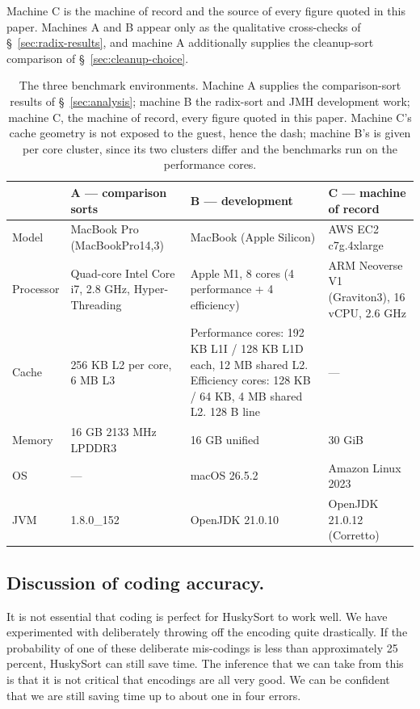 \documentclass[twoside,leqno,twocolumn]{article}
\begin{document}
Machine C is the machine of record and the source of every figure quoted in this paper.
Machines A and B appear only as the qualitative cross-checks of \S~\ref{sec:radix-results}, and
machine A additionally supplies the cleanup-sort comparison of \S~\ref{sec:cleanup-choice}.

\begin{table}
  \caption{The three benchmark environments. Machine A supplies the comparison-sort results of
    \S~\ref{sec:analysis}; machine B the radix-sort and JMH development work; machine C, the machine
    of record, every figure quoted in this paper. Machine C's cache geometry is not exposed to the
    guest, hence the dash; machine B's is given per core cluster, since its two clusters differ and
    the benchmarks run on the performance cores.}
  \label{tab:SysEnv}
  \centering
  \begin{tabularx}{\linewidth}{lXXX}
    \toprule
    & \textbf{A} --- comparison sorts & \textbf{B} --- development & \textbf{C} --- machine of record \\
    \midrule
    Model & MacBook Pro (MacBookPro14,3) & MacBook (Apple Silicon) & AWS EC2 c7g.4xlarge \\
    Processor & Quad-core Intel Core i7, 2.8 GHz, Hyper-Threading & Apple M1, 8 cores (4 performance + 4 efficiency) & ARM Neoverse V1 (Graviton3), 16 vCPU, 2.6 GHz \\
    Cache & 256 KB L2 per core, 6 MB L3 & Performance cores: 192 KB L1I / 128 KB L1D each, 12 MB shared L2. Efficiency cores: 128 KB / 64 KB, 4 MB shared L2. 128 B line & --- \\
    Memory & 16 GB 2133 MHz LPDDR3 & 16 GB unified & 30 GiB \\
    OS & --- & macOS 26.5.2 & Amazon Linux 2023 \\
    JVM & 1.8.0\_152 & OpenJDK 21.0.10 & OpenJDK 21.0.12 (Corretto) \\
    \bottomrule
  \end{tabularx}
\end{table}

\subsection{Discussion of coding accuracy.}
It is not essential that coding is perfect for HuskySort to work well.
We have experimented with deliberately throwing off the encoding quite drastically.
If the probability of one of these deliberate mis-codings is less than approximately 25 percent, HuskySort can still save time.
The inference that we can take from this is that it is not critical that encodings are all very good.
We can be confident that we are still saving time up to about one in four errors.
\end{document}
